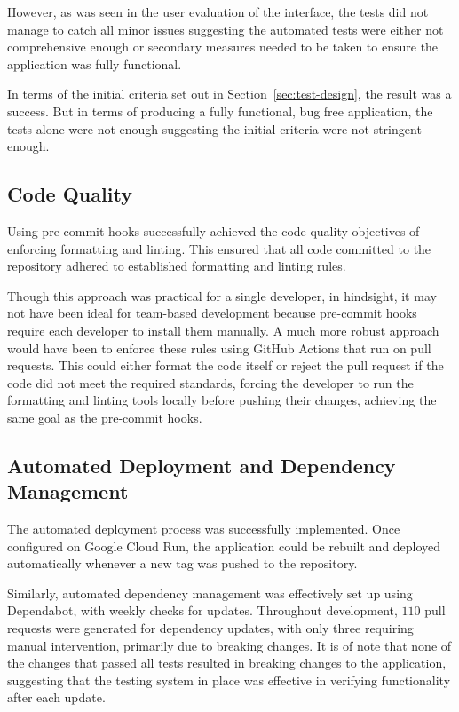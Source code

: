 However, as was seen in the user evaluation of the interface, the tests did not manage to catch all minor issues suggesting the automated tests were either not comprehensive enough or secondary measures needed to be taken to ensure the application was fully functional.

In terms of the initial criteria set out in Section~\ref{sec:test-design}, the result was a success. But in terms of producing a fully functional, bug free application, the tests alone were not enough suggesting the initial criteria were not stringent enough.

\ifshowappendix
\fi

\subsection{Code Quality}
Using pre-commit hooks successfully achieved the code quality objectives of enforcing formatting and linting. This ensured that all code committed to the repository adhered to established formatting and linting rules.

Though this approach was practical for a single developer, in hindsight, it may not have been ideal for team-based development because pre-commit hooks require each developer to install them manually. A much more robust approach would have been to enforce these rules using GitHub Actions that run on pull requests. This could either format the code itself or reject the pull request if the code did not meet the required standards, forcing the developer to run the formatting and linting tools locally before pushing their changes, achieving the same goal as the pre-commit hooks.

\subsection{Automated Deployment and Dependency Management}
The automated deployment process was successfully implemented. Once configured on Google Cloud Run, the application could be rebuilt and deployed automatically whenever a new tag was pushed to the repository.

Similarly, automated dependency management was effectively set up using Dependabot, with weekly checks for updates. Throughout development, $110$ pull requests were generated for dependency updates, with only three requiring manual intervention, primarily due to breaking changes. It is of note that none of the changes that passed all tests resulted in breaking changes to the application, suggesting that the testing system in place was effective in verifying functionality after each update.
